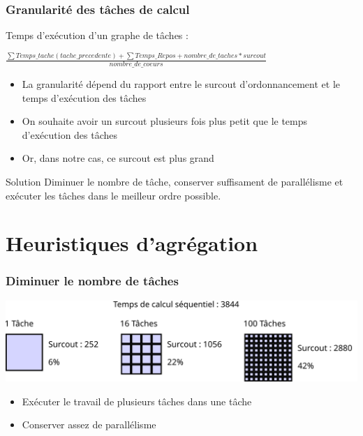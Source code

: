 \documentclass{beamer}
\begin{document}
\begin{frame}
  \frametitle{Granularité des tâches de calcul}

  Temps d'exécution d'un graphe de tâches :

  \bigskip

  $\frac{\sum Temps\_tache(tache\_precedente) + \sum Temps\_Repos + nombre\_de\_taches * surcout}{nombre\_de\_coeurs}$

  \pause

  \begin{itemize}
  \item<2-> La granularité dépend du rapport entre le surcout d'ordonnancement et le temps d'exécution des tâches
  \item<2-> On souhaite avoir un surcout plusieurs fois plus petit que le temps d'exécution des tâches
  \item<2-> Or, dans notre cas, ce surcout est plus grand
  \end{itemize}

  \pause

  \begin{block}{Solution}
    Diminuer le nombre de tâche, conserver suffisament de parallélisme et exécuter les tâches dans le meilleur ordre possible.
  \end{block}


\end{frame}

\section{Heuristiques d'agrégation}
\begin{frame}
  \frametitle{Diminuer le nombre de tâches}

  \centerline{\includegraphics[width=\linewidth]{overhead}}


  \begin{itemize}
    \item Exécuter le travail de plusieurs tâches dans une tâche
    \item Conserver assez de parallélisme
  \end{itemize}

\end{frame}
\end{document}
